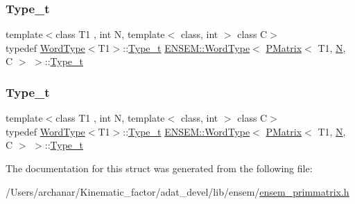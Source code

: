 \subsubsection{\texorpdfstring{Type\_t}{Type\_t}\hspace{0.1cm}{\footnotesize\ttfamily [1/2]}}
{\footnotesize\ttfamily template$<$class T1 , int N, template$<$ class, int $>$ class C$>$ \\
typedef \mbox{\hyperlink{structENSEM_1_1WordType}{Word\+Type}}$<$T1$>$\+::\mbox{\hyperlink{structENSEM_1_1WordType_3_01PMatrix_3_01T1_00_01N_00_01C_01_4_01_4_a892bcf86195d7872e78b5a8b6a1e1734}{Type\+\_\+t}} \mbox{\hyperlink{structENSEM_1_1WordType}{E\+N\+S\+E\+M\+::\+Word\+Type}}$<$ \mbox{\hyperlink{classENSEM_1_1PMatrix}{P\+Matrix}}$<$ T1, \mbox{\hyperlink{operator__name__util_8cc_a7722c8ecbb62d99aee7ce68b1752f337}{N}}, C $>$ $>$\+::\mbox{\hyperlink{structENSEM_1_1WordType_3_01PMatrix_3_01T1_00_01N_00_01C_01_4_01_4_a892bcf86195d7872e78b5a8b6a1e1734}{Type\+\_\+t}}}

\mbox{\label{structENSEM_1_1WordType_3_01PMatrix_3_01T1_00_01N_00_01C_01_4_01_4_a892bcf86195d7872e78b5a8b6a1e1734}} 
\subsubsection{\texorpdfstring{Type\_t}{Type\_t}\hspace{0.1cm}{\footnotesize\ttfamily [2/2]}}
{\footnotesize\ttfamily template$<$class T1 , int N, template$<$ class, int $>$ class C$>$ \\
typedef \mbox{\hyperlink{structENSEM_1_1WordType}{Word\+Type}}$<$T1$>$\+::\mbox{\hyperlink{structENSEM_1_1WordType_3_01PMatrix_3_01T1_00_01N_00_01C_01_4_01_4_a892bcf86195d7872e78b5a8b6a1e1734}{Type\+\_\+t}} \mbox{\hyperlink{structENSEM_1_1WordType}{E\+N\+S\+E\+M\+::\+Word\+Type}}$<$ \mbox{\hyperlink{classENSEM_1_1PMatrix}{P\+Matrix}}$<$ T1, \mbox{\hyperlink{operator__name__util_8cc_a7722c8ecbb62d99aee7ce68b1752f337}{N}}, C $>$ $>$\+::\mbox{\hyperlink{structENSEM_1_1WordType_3_01PMatrix_3_01T1_00_01N_00_01C_01_4_01_4_a892bcf86195d7872e78b5a8b6a1e1734}{Type\+\_\+t}}}



The documentation for this struct was generated from the following file\+:\begin{DoxyCompactItemize}
\item 
/\+Users/archanar/\+Kinematic\+\_\+factor/adat\+\_\+devel/lib/ensem/\mbox{\hyperlink{lib_2ensem_2ensem__primmatrix_8h}{ensem\+\_\+primmatrix.\+h}}\end{DoxyCompactItemize}
